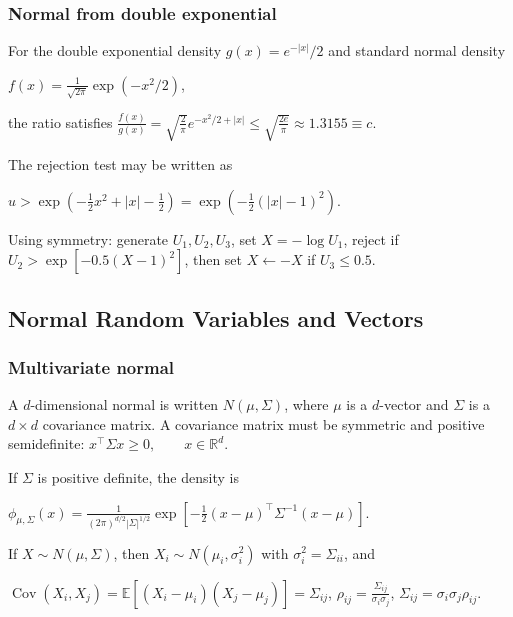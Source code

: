 

\subsubsection*{Normal from double exponential}

For the double exponential density $g(x)=e^{-|x|}/2$ and standard normal density

$f(x)=\frac{1}{\sqrt{2\pi}}\exp(-x^2/2)$,

the ratio satisfies
$\frac{f(x)}{g(x)}=\sqrt{\frac{2}{\pi}}e^{-x^2/2+|x|}\le\sqrt{\frac{2e}{\pi}}\approx1.3155\equiv c$.

The rejection test may be written as

$u>\exp\left(-\frac12x^2+|x|-\frac12\right)=\exp\left(-\frac12(|x|-1)^2\right)$.

Using symmetry: generate $U_1,U_2,U_3$, set $X=-\log U_1$, reject if $U_2>\exp[-0.5(X-1)^2]$, then set $X\leftarrow -X$ if $U_3\le0.5$.

\subsection{Normal Random Variables and Vectors}

\subsubsection*{Multivariate normal}

A $d$-dimensional normal is written $N(\mu,\Sigma)$, where $\mu$ is a $d$-vector and $\Sigma$ is a $d\times d$ covariance matrix. A covariance matrix must be symmetric and positive semidefinite:
$x^\top\Sigma x\ge0,\qquad x\in\mathbb{R}^d$.

If $\Sigma$ is positive definite, the density is

$\phi_{\mu,\Sigma}(x)=\frac{1}{(2\pi)^{d/2}|\Sigma|^{1/2}}\exp\left[-\frac12(x-\mu)^\top\Sigma^{-1}(x-\mu)\right]$.

If $X\sim N(\mu,\Sigma)$, then $X_i\sim N(\mu_i,\sigma_i^2)$ with $\sigma_i^2=\Sigma_{ii}$, and

$\operatorname{Cov}(X_i,X_j)=\mathbb{E}[(X_i-\mu_i)(X_j-\mu_j)]=\Sigma_{ij}$,
$\rho_{ij}=\frac{\Sigma_{ij}}{\sigma_i\sigma_j}$, $\Sigma_{ij}=\sigma_i\sigma_j\rho_{ij}$.

